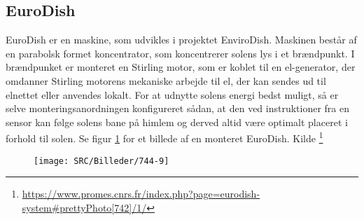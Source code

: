 \documentclass[12pt,a4paper]{article}
\begin{document}
			\subsection{EuroDish}
			EuroDish er en maskine, som udvikles i projektet EnviroDish. Maskinen består
			af en parabolsk formet koncentrator, som koncentrerer solens lys i et brændpunkt. 
			I brændpunket er monteret en Stirling motor, som er koblet til en el-generator,
			der omdanner Stirling motorens mekaniske arbejde til el, der kan sendes ud til 
			elnettet eller anvendes lokalt. For at udnytte solens energi bedst muligt, så er
			selve monteringsanordningen konfigureret sådan, at den ved instruktioner fra en 
			sensor kan følge solens bane på himlem og derved altid være optimalt placeret i forhold til solen. Se figur \ref{fig:744-9} for et billede af en 
			monteret EuroDish. Kilde \footnote{\url{https://www.promes.cnrs.fr/index.php?page=eurodish-system#prettyPhoto[742]/1/}}
			\begin{figure}[h!]
				\centerings
				\texttt{[image: SRC/Billeder/744-9]}
				\caption{}
				\label{fig:744-9}
			\end{figure}
			
			
			
			
			
			
\end{document}
